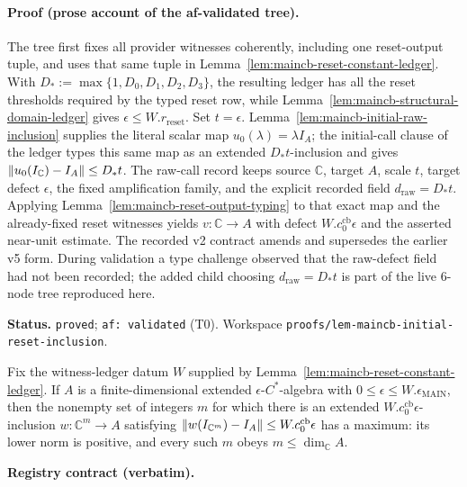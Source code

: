 \paragraph{Proof (prose account of the af-validated tree).}
The tree first fixes all provider witnesses coherently, including one reset-output tuple, and uses
that same tuple in Lemma~\ref{lem:maincb-reset-constant-ledger}.  With
$D_*:=\max\{1,D_0,D_1,D_2,D_3\}$, the resulting ledger has all the reset thresholds required by
the typed reset row, while Lemma~\ref{lem:maincb-structural-domain-ledger} gives
$\epsilon\leq W.r_{\mathrm{reset}}$.  Set $t=\epsilon$.  Lemma~\ref{lem:maincb-initial-raw-inclusion}
supplies the literal scalar map $u_0(\lambda)=\lambda I_A$; the initial-call clause of the ledger
types this same map as an extended $D_*t$-inclusion and gives
$\lVert u_0(I_{\mathbb C})-I_A\rVert\leq D_*t$.  The raw-call record keeps source $\mathbb C$, target $A$,
scale $t$, target defect $\epsilon$, the fixed amplification family, and the explicit recorded field
$d_{\mathrm{raw}}=D_*t$.  Applying Lemma~\ref{lem:maincb-reset-output-typing} to that exact map and
the already-fixed reset witnesses yields $v:\mathbb C\to A$ with defect
$W.c^{\mathrm{cb}}_0\epsilon$ and the asserted near-unit estimate.  The recorded v2 contract amends
and supersedes the earlier v5 form.  During validation a type challenge observed that the raw-defect
field had not been recorded; the added child choosing $d_{\mathrm{raw}}=D_*t$ is part of the live
$6$-node tree reproduced here.

\medskip\noindent\textbf{Status.} \texttt{proved}; \texttt{af: validated} (T0).  Workspace
\texttt{proofs/lem-maincb-initial-reset-inclusion}.

\begin{lemma}\label{lem:maincb-maximal-reset-selection}
Fix the witness-ledger datum $W$ supplied by Lemma~\ref{lem:maincb-reset-constant-ledger}.  If $A$
is a finite-dimensional extended $\epsilon$-$C^*$-algebra with
$0\leq\epsilon\leq W.\epsilon_{\mathrm{MAIN}}$, then the nonempty set of integers $m$ for which
there is an extended $W.c^{\mathrm{cb}}_0\epsilon$-inclusion $w:\mathbb C^m\to A$ satisfying
$\lVert w(I_{\mathbb C^m})-I_A\rVert\leq W.c^{\mathrm{cb}}_0\epsilon$ has a maximum: its lower norm is
positive, and every such $m$ obeys $m\leq\dim_{\mathbb C}A$.
\end{lemma}

\noindent\textbf{Registry contract (verbatim).}

